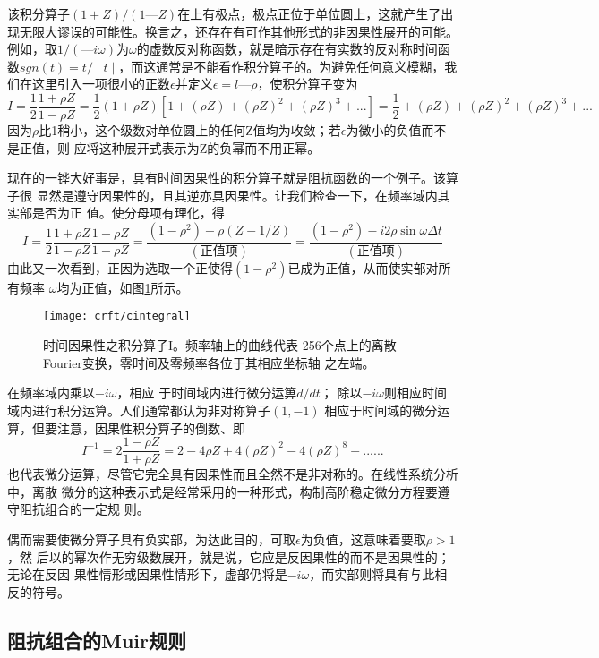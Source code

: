 该积分算子$(1 + Z)/(1 — Z)$在上有极点，极点正位于单位圆上，这就产生了出现无限大谬误的可能性。换言之，还存在有可作其他形式的非因果性展开的可能。例如，取$1/( —i\omega )$为$\omega$的虚数反对称函数，就是暗示存在有实数的反对称时间函数$sgn(t)=t/\mid t\mid$，而这通常是不能看作积分算子的。为避免任何意义模糊，我们在这里引入一项很小的正数$\epsilon$并定义$\epsilon =l—\rho$，使积分算子变为
\begin{subequations}
\begin{equation}
I=\frac{1}{2}\frac{1+\rho Z}{1-\rho Z}=\frac{1}{2}(1+\rho Z)
[1+(\rho Z)+(\rho Z)^2+(\rho Z)^3+...]
\label{eq:ex4.6.15a}
\end{equation}
\begin{equation}
=\frac{1}{2}+(\rho Z)+(\rho Z)^2+(\rho Z)^3+...
\label{eq:ex4.6.15b}
\end{equation}
\label{eq:ex4.6.15}
\end{subequations}
因为$\rho$比1稍小，这个级数对单位圆上的任何Z值均为收敛；若$\epsilon$为微小的负值而不是正值，则
应将这种展开式表示为Z的负幂而不用正幂。

现在的一铧大好事是，具有时间因果性的积分算子就是阻抗函数的一个例子。该算子很
显然是遵守因果性的，且其逆亦具因果性。让我们检查一下，在频率域内其实部是否为正
值。使分母项有理化，得
\begin{subequations}
\begin{equation}
I=\frac{1}{2}\frac{1+\rho Z}{1-\rho Z}\frac{1-\rho Z}{1-\rho Z}=
\frac{(1-\rho^2)+\rho(Z-1/Z)}{(\text{正值项})}
\label{eq:ex4.6.16a}
\end{equation}
\begin{equation}
=\frac{(1-\rho^2)-i2\rho\sin\omega\Delta t}{(\text{正值项})}
\label{eq:ex4.6.16b}
\end{equation}
\label{eq:ex4.6.16}
\end{subequations}
由此又一次看到，正因为选取一个正使得$(1-\rho^2)$已成为正值，从而使实部对所有频率
$\omega$均为正值，如图\ref{fig:crft/cintegral}所示。

\begin{figure}[H]
\centering
\texttt{[image: crft/cintegral]}
\caption[cintegral]{时间因果性之积分算子I。频率轴上的曲线代表
256个点上的离散Fourier变换，零时间及零频率各位于其相应坐标轴
之左端。}
\label{fig:crft/cintegral}
\end{figure}

在频率域内乘以$-i\omega$，相应
于时间域内进行微分运箅$d/dt$；
除以$-i\omega$则相应时间域内进行积分运算。人们通常都认为非对称算子$(1,-1)$
相应于时间域的微分运算，但要注意，因果性积分算子的倒数、即
\begin{equation}
I^{-1}=2\frac{1-\rho Z}{1+\rho Z}=2-4\rho Z+4(\rho Z)^2-4(\rho Z)^8+
......
\label{eq:ex4.6.17}
\end{equation}
也代表微分运算，尽管它完全具有因果性而且全然不是非对称的。在线性系统分析中，离散
微分的这种表示式是经常采用的一种形式，构制高阶稳定微分方程要遵守阻抗组合的一定规
则。

偶而需要使微分算子具有负实部，为达此目的，可取$\epsilon$为负值，这意味着要取$\rho>1$，然
后以的幂次作无穷级数展开，就是说，它应是反因果性的而不是因果性的；无论在反因
果性情形或因果性情形下，虚部仍将是$-i\omega$，而实部则将具有与此相反的符号。


\subsection{阻抗组合的Muir规则}
\label{sec:4.6.5}



